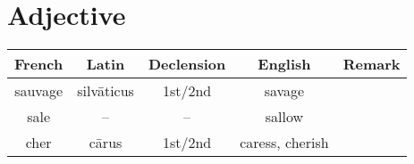 \documentclass{article}
\begin{document}
\section{Adjective}

\begin{longtable}{ccccc}
    \toprule
    French & Latin & Declension & English & Remark \\
    \midrule
    sauvage & silv\=aticus & 1st/2nd & savage & \\
    sale & -- & -- & sallow \\
    cher & cārus & 1st/2nd & caress, cherish \\
    \bottomrule
\end{longtable}

% 
% 
\end{document}
